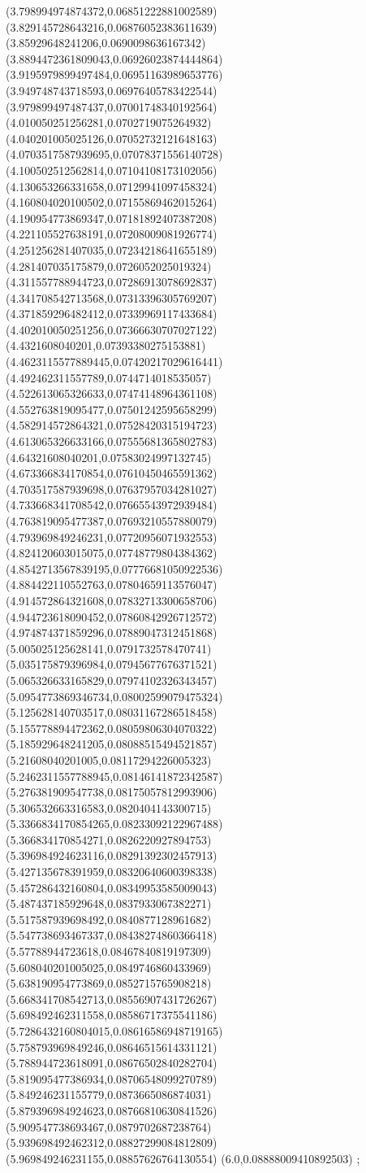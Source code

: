 {(3.798994974874372,0.06851222881002589)
(3.829145728643216,0.06876052383611639)
(3.85929648241206,0.0690098636167342)
(3.8894472361809043,0.06926023874444864)
(3.9195979899497484,0.06951163989653776)
(3.949748743718593,0.06976405783422544)
(3.979899497487437,0.07001748340192564)
(4.010050251256281,0.0702719075264932)
(4.040201005025126,0.07052732121648163)
(4.0703517587939695,0.07078371556140728)
(4.100502512562814,0.07104108173102056)
(4.130653266331658,0.07129941097458324)
(4.160804020100502,0.07155869462015264)
(4.190954773869347,0.07181892407387208)
(4.221105527638191,0.07208009081926774)
(4.251256281407035,0.07234218641655189)
(4.281407035175879,0.0726052025019324)
(4.311557788944723,0.07286913078692837)
(4.341708542713568,0.07313396305769207)
(4.371859296482412,0.07339969117433684)
(4.402010050251256,0.07366630707027122)
(4.4321608040201,0.07393380275153881)
(4.4623115577889445,0.07420217029616441)
(4.492462311557789,0.0744714018535057)
(4.522613065326633,0.07474148964361108)
(4.552763819095477,0.07501242595658299)
(4.582914572864321,0.07528420315194723)
(4.613065326633166,0.07555681365802783)
(4.64321608040201,0.07583024997132745)
(4.673366834170854,0.07610450465591362)
(4.703517587939698,0.07637957034281027)
(4.733668341708542,0.07665543972939484)
(4.763819095477387,0.07693210557880079)
(4.793969849246231,0.07720956071932553)
(4.824120603015075,0.07748779804384362)
(4.8542713567839195,0.07776681050922536)
(4.884422110552763,0.07804659113576047)
(4.914572864321608,0.07832713300658706)
(4.944723618090452,0.07860842926712572)
(4.974874371859296,0.07889047312451868)
(5.005025125628141,0.0791732578470741)
(5.035175879396984,0.07945677676371521)
(5.065326633165829,0.07974102326343457)
(5.0954773869346734,0.08002599079475324)
(5.125628140703517,0.08031167286518458)
(5.155778894472362,0.08059806304070322)
(5.185929648241205,0.08088515494521857)
(5.21608040201005,0.08117294226005323)
(5.2462311557788945,0.08146141872342587)
(5.276381909547738,0.08175057812993906)
(5.306532663316583,0.0820404143300715)
(5.3366834170854265,0.08233092122967488)
(5.366834170854271,0.0826220927894753)
(5.396984924623116,0.08291392302457913)
(5.427135678391959,0.08320640600398338)
(5.457286432160804,0.08349953585009043)
(5.487437185929648,0.0837933067382271)
(5.517587939698492,0.0840877128961682)
(5.547738693467337,0.08438274860366418)
(5.57788944723618,0.08467840819197309)
(5.608040201005025,0.0849746860433969)
(5.638190954773869,0.0852715765908218)
(5.668341708542713,0.08556907431726267)
(5.698492462311558,0.08586717375541186)
(5.7286432160804015,0.08616586948719165)
(5.758793969849246,0.08646515614331121)
(5.788944723618091,0.08676502840282704)
(5.819095477386934,0.08706548099270789)
(5.849246231155779,0.0873665086874031)
(5.879396984924623,0.08766810630841526)
(5.909547738693467,0.0879702687238764)
(5.939698492462312,0.08827299084812809)
(5.969849246231155,0.08857626764130554)
(6.0,0.08888009410892503)
};
